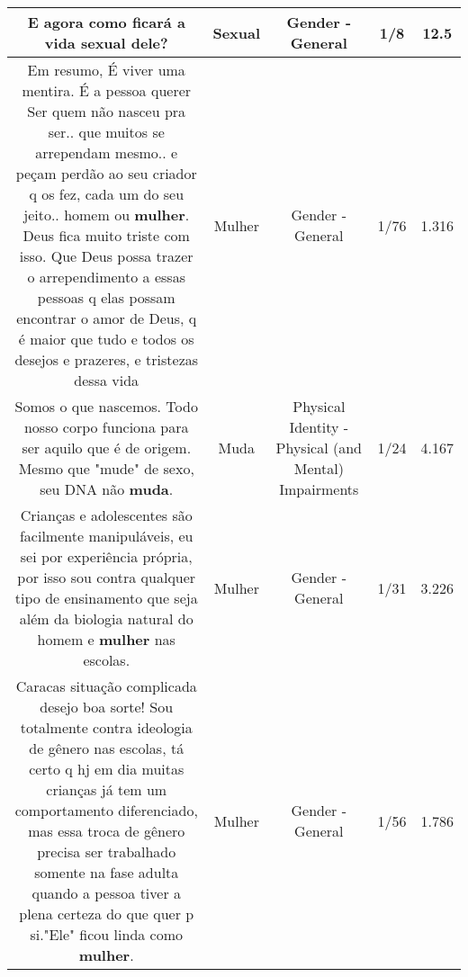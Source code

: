 \documentclass[11pt]{article}
\newlength\mylength
\begin{document}
\begin{center}
\begin{longtable}{|C{.65\mylength}|C{.30\mylength}|C{.12\mylength}|C{.12\mylength}|C{.12\mylength}|}
  \small E agora como ficará a vida \textbf{sexual} dele?\normalsize   & Sexual & Gender - General & 1/8 & 12.5 \\  \hline
  \small Em resumo, É viver uma mentira. É a pessoa querer Ser quem não nasceu pra ser.. que muitos se arrependam mesmo.. e peçam perdão ao seu criador q os fez, cada um do seu jeito.. homem ou \textbf{mulher}. Deus fica muito triste com isso.  Que Deus possa trazer o arrependimento a essas pessoas q elas possam encontrar o amor de Deus, q é maior que tudo e todos os desejos e prazeres, e tristezas dessa vida\normalsize   & Mulher & Gender - General & 1/76 & 1.316 \\  \hline
  \small Somos o que nascemos. Todo nosso corpo funciona para ser aquilo que é de origem. Mesmo que "mude" de sexo, seu DNA não \textbf{muda}.\normalsize   & Muda & Physical Identity - Physical (and Mental) Impairments & 1/24 & 4.167 \\  \hline
  \small Crianças e adolescentes são facilmente manipuláveis, eu sei por experiência própria, por isso sou contra qualquer tipo de ensinamento que seja além da biologia natural do homem e \textbf{mulher} nas escolas.\normalsize   & Mulher & Gender - General & 1/31 & 3.226 \\  \hline
  \small Caracas situação complicada desejo boa sorte! Sou totalmente contra ideologia de gênero nas escolas, tá certo q hj em dia muitas crianças já tem um comportamento diferenciado, mas essa troca de gênero precisa ser trabalhado somente na fase adulta quando a pessoa tiver a plena certeza do que quer p si."Ele" ficou linda como \textbf{mulher}.\normalsize   & Mulher & Gender - General & 1/56 & 1.786 \\  \hline

\end{longtable}
\end{center}
\end{document}
